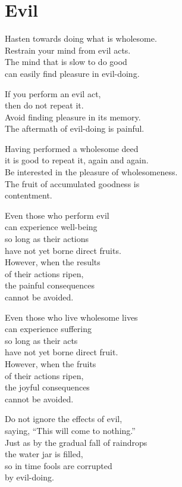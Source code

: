 \chapter{Evil}


Hasten towards doing what is wholesome.\\
Restrain your mind from evil acts.\\
The mind that is slow to do good\\
can easily find pleasure in evil-doing.


If you perform an evil act,\\
then do not repeat it.\\
Avoid finding pleasure in its memory.\\
The aftermath of evil-doing is painful.


Having performed a wholesome deed\\
it is good to repeat it, again and again.\\
Be interested in the pleasure of wholesomeness.\\
The fruit of accumulated goodness is\\
\vin contentment.


Even those who perform evil\\
can experience well-being\\
so long as their actions\\
have not yet borne direct fruits.\\
However, when the results\\
of their actions ripen,\\
the painful consequences\\
cannot be avoided.


Even those who live wholesome lives\\
can experience suffering\\
so long as their acts\\
have not yet borne direct fruit.\\
However, when the fruits\\
of their actions ripen,\\
the joyful consequences\\
cannot be avoided.


Do not ignore the effects of evil,\\
saying, “This will come to nothing.”\\
Just as by the gradual fall of raindrops\\
the water jar is filled,\\
so in time fools are corrupted\\
by evil-doing.

